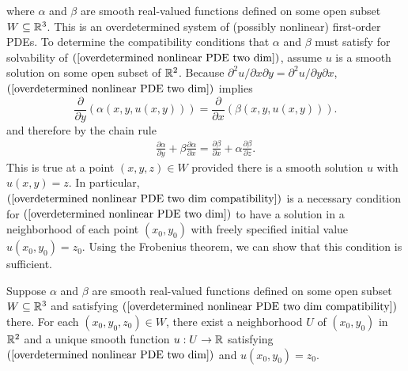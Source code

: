 where $\alpha$ and $\beta$ are smooth real-valued functions defined on some open subset $W\subseteq\mathbb{R}^3$. This is an overdetermined system of (possibly nonlinear) first-order PDEs.
To determine the compatibility conditions that $\alpha$ and $\beta$ must satisfy for solvability of $(\ref{overdetermined nonlinear PDE two dim})$, assume $u$ is a smooth solution on some open subset of $\mathbb{R}^2$. Because $\partial^2u/\partial x\partial y=\partial^2u/\partial y\partial x$, $(\ref{overdetermined nonlinear PDE two dim})$ implies
\[\frac{\partial}{\partial y}(\alpha(x,y,u(x,y)))=\frac{\partial}{\partial x}(\beta(x,y,u(x,y))).\]
and therefore by the chain rule
\begin{align}\label{overdetermined nonlinear PDE two dim compatibility}
\frac{\partial\alpha}{\partial y}+\beta\frac{\partial\alpha}{\partial x}=\frac{\partial\beta}{\partial x}+\alpha\frac{\partial\beta}{\partial z}.
\end{align}
This is true at a point $(x,y,z)\in W$ provided there is a smooth solution $u$ with $u(x,y)=z$. In particular, $(\ref{overdetermined nonlinear PDE two dim compatibility})$ is a necessary condition for $(\ref{overdetermined nonlinear PDE two dim})$ to have a solution in a neighborhood of each point $(x_0,y_0)$ with freely specified initial value $u(x_0,y_0)=z_0$. Using the Frobenius theorem, we can show that this condition is sufficient.
\begin{proposition}\label{overdetermined nonlinear PDE two dim solution}
Suppose $\alpha$ and $\beta$ are smooth real-valued functions defined on some open subset $W\subseteq\mathbb{R}^3$ and satisfying $(\ref{overdetermined nonlinear PDE two dim compatibility})$ there. For each $(x_0,y_0,z_0)\in W$, there exist a neighborhood $U$ of $(x_0,y_0)$ in $\mathbb{R}^2$ and a unique smooth function $u:U\to\mathbb{R}$ satisfying $(\ref{overdetermined nonlinear PDE two dim})$ and $u(x_0,y_0)=z_0$.
\end{proposition}
